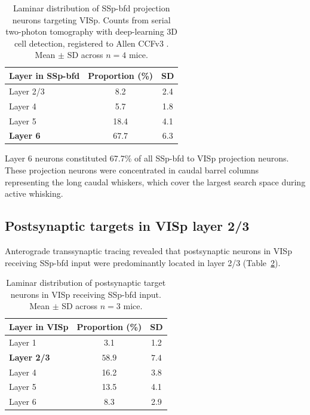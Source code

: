 \documentclass[11pt]{article}
\begin{document}
\begin{table}[H]
\centering
\caption{Laminar distribution of SSp-bfd projection neurons targeting VISp. Counts from serial two-photon tomography with deep-learning 3D cell detection, registered to Allen CCFv3 \citep{wang2020atlas}. Mean $\pm$ SD across $n = 4$ mice.}
\label{tab:laminar}
\begin{tabular}{lcc}
\toprule
\textbf{Layer in SSp-bfd} & \textbf{Proportion (\%)} & \textbf{SD} \\
\midrule
Layer 2/3 & 8.2 & 2.4 \\
Layer 4 & 5.7 & 1.8 \\
Layer 5 & 18.4 & 4.1 \\
\textbf{Layer 6} & $\mathbf{67.7}$ & $\mathbf{6.3}$ \\
\bottomrule
\end{tabular}
\end{table}

Layer 6 neurons constituted 67.7\% of all SSp-bfd to VISp projection neurons. These projection neurons were concentrated in caudal barrel columns representing the long caudal whiskers, which cover the largest search space during active whisking.

\subsection{Postsynaptic targets in VISp layer 2/3}

Anterograde transsynaptic tracing revealed that postsynaptic neurons in VISp receiving SSp-bfd input were predominantly located in layer 2/3 (Table~\ref{tab:targets}).

\begin{table}[H]
\centering
\caption{Laminar distribution of postsynaptic target neurons in VISp receiving SSp-bfd input. Mean $\pm$ SD across $n = 3$ mice.}
\label{tab:targets}
\begin{tabular}{lcc}
\toprule
\textbf{Layer in VISp} & \textbf{Proportion (\%)} & \textbf{SD} \\
\midrule
Layer 1 & 3.1 & 1.2 \\
\textbf{Layer 2/3} & $\mathbf{58.9}$ & $\mathbf{7.4}$ \\
Layer 4 & 16.2 & 3.8 \\
Layer 5 & 13.5 & 4.1 \\
Layer 6 & 8.3 & 2.9 \\
\bottomrule
\end{tabular}
\end{table}
\end{document}
